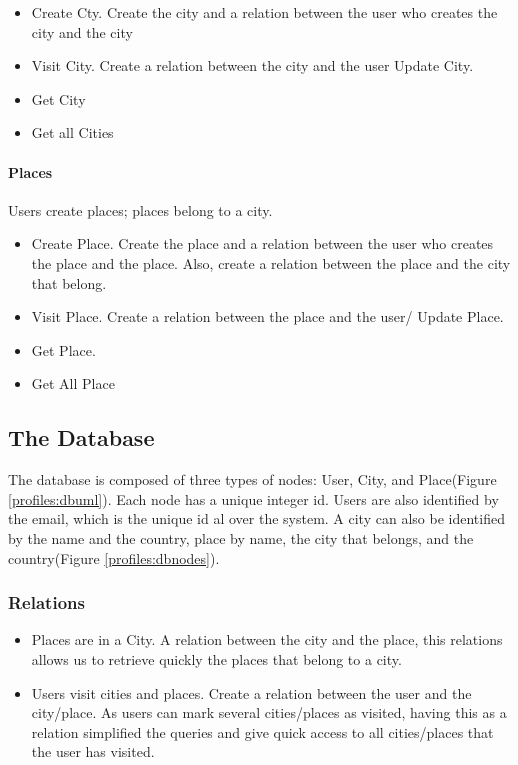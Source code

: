 \begin{itemize}
	\item Create Cty.  Create the city and a relation between the user who creates the city and the city
	\item Visit City. Create a relation between the city and the user
	Update City. 
	\item Get City
	\item Get all Cities
\end{itemize}

\paragraph{Places}


\indent
Users create places; places belong to a city.

\begin{itemize}
	\item Create Place. Create the place and a relation between the user who creates the place and the place. Also, create a relation between the place and the city that belong.
	\item Visit Place. Create a relation between the place and the user/
	Update Place.
   \item	Get Place.
	\item Get All Place
\end{itemize}

\subsection{The Database}

\indent
\indent
The database is composed of three types of nodes: User, City, and Place(Figure \ref{profiles:dbuml}). Each node has a unique integer id. Users are also identified by the email, which is the unique id al over the system. A city can also be identified by the name and the country, place by name, the city that belongs, and the country(Figure \ref{profiles:dbnodes}).


\subsubsection{Relations}

\begin{itemize}
	\item  Places are in a City.  A relation between the city and the place, this relations allows us to retrieve quickly the places that belong to a city.
	
	\item Users visit cities and places. Create a relation between the user and the city/place. As users can mark several cities/places as visited, having this as a relation simplified the queries and give quick access to all cities/places that the user has visited.
\end{itemize}


